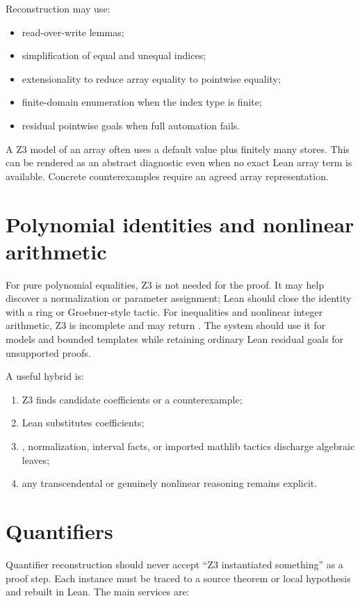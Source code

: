 \documentclass[11pt,letterpaper,openany]{report}
\newcommand{\code}[1]{\texttt{\detokenize{#1}}}
\begin{document}
Reconstruction may use:

\begin{itemize}
  \item read-over-write lemmas;
  \item simplification of equal and unequal indices;
  \item extensionality to reduce array equality to pointwise equality;
  \item finite-domain enumeration when the index type is finite;
  \item residual pointwise goals when full automation fails.
\end{itemize}

A Z3 model of an array often uses a default value plus finitely many stores. This can
be rendered as an abstract diagnostic even when no exact Lean array term is available.
Concrete counterexamples require an agreed array representation.

\section{Polynomial identities and nonlinear arithmetic}

For pure polynomial equalities, Z3 is not needed for the proof. It may help discover a
normalization or parameter assignment; Lean should close the identity with a ring or
Groebner-style tactic. For inequalities and nonlinear integer arithmetic, Z3 is
incomplete and may return \code{unknown}. The system should use it for models and
bounded templates while retaining ordinary Lean residual goals for unsupported
proofs.

A useful hybrid is:

\begin{enumerate}
  \item Z3 finds candidate coefficients or a counterexample;
  \item Lean substitutes coefficients;
  \item \code{grobner}, normalization, interval facts, or imported mathlib tactics
        discharge algebraic leaves;
  \item any transcendental or genuinely nonlinear reasoning remains explicit.
\end{enumerate}

\section{Quantifiers}

Quantifier reconstruction should never accept ``Z3 instantiated something'' as a
proof step. Each instance must be traced to a source theorem or local hypothesis and
rebuilt in Lean. The main services are:
\end{document}
